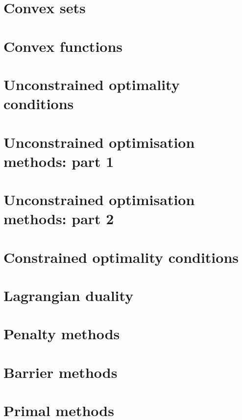 \documentclass{bookest}
\begin{document}
	\chapter{Convex sets}
	
	
	\chapter{Convex functions}
	
	
	\chapter{Unconstrained optimality conditions}
	
	
	\chapter{Unconstrained optimisation methods: part 1}
	
	
	\chapter{Unconstrained optimisation methods: part 2}
	
	
	\chapter{Constrained optimality conditions}
		
	
	\chapter{Lagrangian duality}
		
	
	\chapter{Penalty methods}
	
	
	\chapter{Barrier methods}
	
	
	\chapter{Primal methods}
	
	
\end{document}
